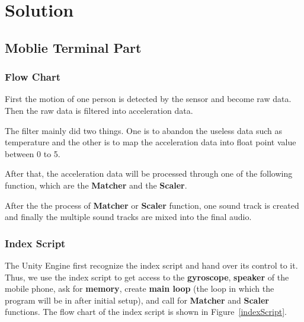 \section{Solution}

\subsection{Moblie Terminal Part}

\subsubsection{Flow Chart}

   First the motion of one person is detected by the sensor and become raw data.
   Then the raw data is filtered into acceleration data. 

   The filter mainly did two things.
   One is to abandon the useless data such as temperature and the other is to
   map the acceleration data into float point value between 0 to 5. 

   After that, the acceleration data will be processed through one of the
   following function, which are the \textbf{Matcher} and the \textbf{Scaler}. 

   After the the process of \textbf{Matcher} or \textbf{Scaler} function, one sound track is
   created and finally the multiple sound tracks are mixed into the final audio.

\subsubsection{Index Script}

The Unity Engine first recognize the index script and hand over its control to
it.  
Thus, we use the index script to get access to the 
\textbf{gyroscope}, \textbf{speaker} of the mobile phone, 
 ask for \textbf{memory}, create \textbf{main loop} (the loop in which the
 program will be in after initial setup), and call for 
\textbf{Matcher} and \textbf{Scaler} functions. 
The flow chart of the index script is shown in Figure~\ref{indexScript}.

